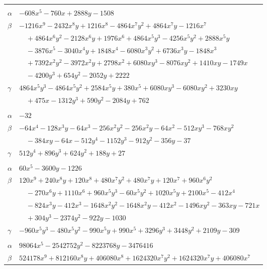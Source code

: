\documentclass[11pt]{article}
\begin{document}
\begin{longtable}{@{}ll@{}}
\addlinespace[3pt]
\multicolumn{2}{@{}l}{$\{i,j\}=\{6,40\}$, $k_{ij}=2^{4}\cdot 3$}\\
$\alpha$ & $-608x^{5}-760x+2888y-1508$\\
$\beta$ & $-1216x^{9}-2432x^{8}y+1216x^{8}-4864x^{7}y^{2}+4864x^{7}y-1216x^{7}$\\
 & $\quad +4864x^{6}y^{2}-2128x^{6}y+1976x^{6}+4864x^{5}y^{3}-4256x^{5}y^{2}+2888x^{5}y$\\
 & $\quad -3876x^{5}-3040x^{4}y+1848x^{4}-6080x^{3}y^{2}+6736x^{3}y-1848x^{3}$\\
 & $\quad +7392x^{2}y^{2}-3972x^{2}y+2798x^{2}+6080xy^{3}-8076xy^{2}+1410xy-1749x$\\
 & $\quad -4200y^{3}+654y^{2}-2052y+2222$\\
$\gamma$ & $4864x^{5}y^{3}-4864x^{5}y^{2}+2584x^{5}y+380x^{5}+6080xy^{3}-6080xy^{2}+3230xy$\\
 & $\quad +475x-1312y^{3}+590y^{2}-2084y+762$\\
\addlinespace[3pt]
\multicolumn{2}{@{}l}{$\{i,j\}=\{7,11\}$, $k_{ij}=7^{2}$}\\
$\alpha$ & $-32$\\
$\beta$ & $-64x^{4}-128x^{3}y-64x^{3}-256x^{2}y^{2}-256x^{2}y-64x^{2}-512xy^{3}-768xy^{2}$\\
 & $\quad -384xy-64x-512y^{4}-1152y^{3}-912y^{2}-356y-37$\\
$\gamma$ & $512y^{4}+896y^{3}+624y^{2}+188y+27$\\
\addlinespace[3pt]
\multicolumn{2}{@{}l}{$\{i,j\}=\{7,17\}$, $k_{ij}=2^{2}\cdot 7^{2}$}\\
$\alpha$ & $60x^{5}-3600y-1226$\\
$\beta$ & $120x^{9}+240x^{8}y+120x^{8}+480x^{7}y^{2}+480x^{7}y+120x^{7}+960x^{6}y^{2}$\\
 & $\quad -270x^{6}y+1110x^{6}+960x^{5}y^{3}-60x^{5}y^{2}+1020x^{5}y+2100x^{5}-412x^{4}$\\
 & $\quad -824x^{3}y-412x^{3}-1648x^{2}y^{2}-1648x^{2}y-412x^{2}-1496xy^{2}-363xy-721x$\\
 & $\quad +304y^{3}-2374y^{2}-922y-1030$\\
$\gamma$ & $-960x^{5}y^{3}-480x^{5}y^{2}-990x^{5}y+990x^{5}+3296y^{3}+3448y^{2}+2109y-309$\\
\addlinespace[3pt]
\multicolumn{2}{@{}l}{$\{i,j\}=\{7,21\}$, $k_{ij}=5^{2}\cdot 11$}\\
$\alpha$ & $98064x^{5}-2542752y^{2}-8223768y-3476416$\\
$\beta$ & $524178x^{9}+812160x^{8}y+406080x^{8}+1624320x^{7}y^{2}+1624320x^{7}y+406080x^{7}$\\

\end{longtable}
\end{document}
